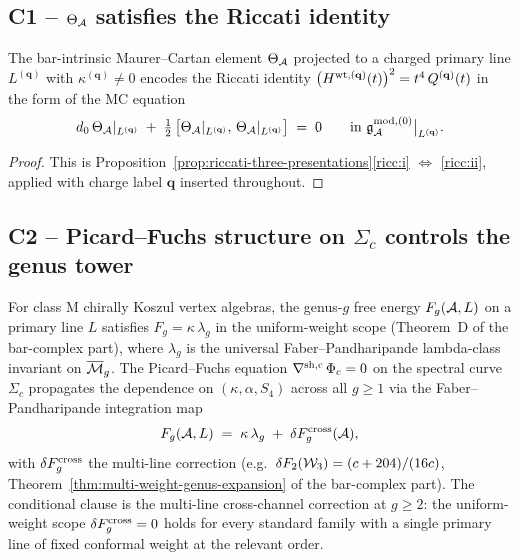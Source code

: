 \subsection{C1 -- $\Theta_{\mathcal{A}}$ satisfies the Riccati identity}
\label{sec:c1-mc-element}

\begin{proposition}
\label{prop:c1-riccati-mc}
\ClaimStatusProvedHere
The bar-intrinsic Maurer--Cartan element $\Theta_{\mathcal{A}}$ projected to a
charged primary line $L^{(\mathbf q)}$ with
$\kappa^{(\mathbf q)} \neq 0$ encodes the Riccati identity
$\bigl(H^{\rm wt,(\mathbf q)}(t)\bigr)^{2}
= t^{4}\,Q^{(\mathbf q)}(t)$ in the form of the MC equation
\[
d_0\,\Theta_{\mathcal{A}}|_{L^{(\mathbf q)}} \;+\; \tfrac{1}{2}\,
\bigl[\Theta_{\mathcal{A}}|_{L^{(\mathbf q)}},\,\Theta_{\mathcal{A}}|_{L^{(\mathbf q)}}\bigr]
\;=\; 0
\qquad
\text{in } \mathfrak g^{\rm mod, (0)}_{\mathcal{A}}\big|_{L^{(\mathbf q)}}.
\]
\end{proposition}

\begin{proof}
This is Proposition~\ref{prop:riccati-three-presentations}\ref{ricc:i}
$\Leftrightarrow$ \ref{ricc:ii}, applied with charge label
$\mathbf q$ inserted throughout.
\end{proof}

\subsection{C2 -- Picard--Fuchs structure on $\Sigma_c$ controls the genus tower}
\label{sec:c2-pf-genus-tower}

\begin{theorem}
\label{thm:c2-pf-genus-tower}
\ClaimStatusConditional
For class M chirally Koszul vertex algebras, the genus-$g$ free
energy $F_g(\mathcal{A}, L)$ on a primary line $L$ satisfies
$F_g = \kappa\,\lambda_g$ in the uniform-weight scope (Theorem~D of
the bar-complex part), where $\lambda_g$ is the universal
Faber--Pandharipande lambda-class invariant on $\overline{\mathcal{M}}_g$.
The Picard--Fuchs equation $\nabla^{\rm sh, c}\,\Phi_c = 0$ on the
spectral curve $\Sigma_c$ propagates the dependence on
$(\kappa, \alpha, S_4)$ across all $g \ge 1$ via the
Faber--Pandharipande integration map
\[
F_g(\mathcal{A}, L)
\;=\; \kappa\,\lambda_g
\;+\; \delta F_g^{\rm cross}(\mathcal{A}),
\]
with $\delta F_g^{\rm cross}$ the multi-line correction (e.g.\
$\delta F_2(\mathcal{W}_3) = (c + 204)/(16 c)$,
Theorem~\ref{thm:multi-weight-genus-expansion} of the bar-complex part).
The conditional clause is the multi-line cross-channel correction at
$g \ge 2$: the uniform-weight scope $\delta F_g^{\rm cross} = 0$ holds
for every standard family with a single primary line of fixed
conformal weight at the relevant order.
\end{theorem}


